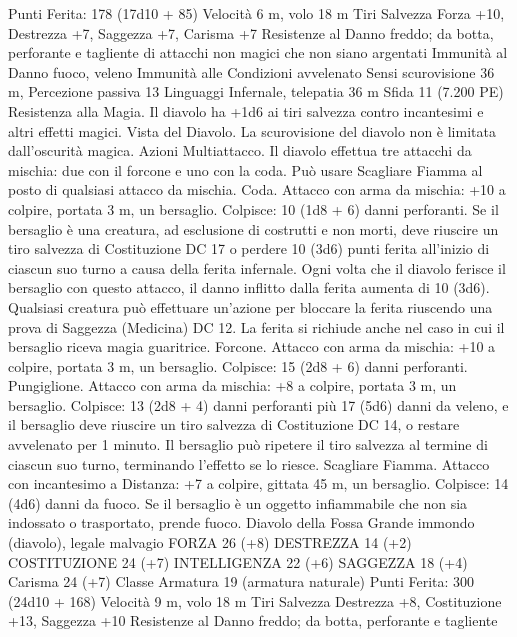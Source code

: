 \begin{multicols}{2}
\hspace*{0pt}\hfill{Punti Ferita}: 178 (17d10 + 85)
Velocità 6 m, volo 18 m
Tiri Salvezza Forza +10, Destrezza +7, Saggezza +7, Carisma
+7
Resistenze al Danno freddo; da botta, perforante e tagliente
di attacchi non magici che non siano argentati
Immunità al Danno fuoco, veleno
Immunità alle Condizioni avvelenato
Sensi scurovisione 36 m, Percezione passiva 13
Linguaggi Infernale, telepatia 36 m
Sfida 11 (7.200 PE)
Resistenza alla Magia. Il diavolo ha +1d6 ai tiri salvezza
contro incantesimi e altri effetti magici.
Vista del Diavolo. La scurovisione del diavolo non è limitata
dall’oscurità magica.
Azioni
Multiattacco. Il diavolo effettua tre attacchi da mischia: due con
il forcone e uno con la coda. Può usare Scagliare Fiamma al
posto di qualsiasi attacco da mischia.
Coda. Attacco con arma da mischia: +10 a colpire, portata 3 m,
un bersaglio.
Colpisce: 10 (1d8 + 6) danni perforanti. Se il bersaglio è una
creatura, ad esclusione di costrutti e non morti, deve riuscire un
tiro salvezza di Costituzione DC 17 o perdere 10 (3d6) punti
ferita all’inizio di ciascun suo turno a causa della ferita infernale.
Ogni volta che il diavolo ferisce il bersaglio con questo attacco,
il danno inflitto dalla ferita aumenta di 10 (3d6). Qualsiasi
creatura può effettuare un’azione per bloccare la ferita riuscendo
una prova di Saggezza (Medicina) DC 12. La ferita si richiude
anche nel caso in cui il bersaglio riceva magia guaritrice.
Forcone. Attacco con arma da mischia: +10 a colpire, portata 3
m, un bersaglio.
Colpisce: 15 (2d8 + 6) danni perforanti.
Pungiglione. Attacco con arma da mischia: +8 a colpire, portata
3 m, un bersaglio.
Colpisce: 13 (2d8 + 4) danni perforanti più 17 (5d6) danni da
veleno, e il bersaglio deve riuscire un tiro salvezza di
Costituzione DC 14, o restare avvelenato per 1 minuto. Il
bersaglio può ripetere il tiro salvezza al termine di ciascun suo
turno, terminando l’effetto se lo riesce.
Scagliare Fiamma. Attacco con incantesimo a Distanza: +7 a
colpire, gittata 45 m, un bersaglio.
Colpisce: 14 (4d6) danni da fuoco. Se il bersaglio è un oggetto
infiammabile che non sia indossato o trasportato, prende fuoco.
Diavolo della Fossa
Grande immondo (diavolo), legale malvagio
FORZA 26 (+8)
DESTREZZA 14 (+2)
COSTITUZIONE 24 (+7)
INTELLIGENZA 22 (+6)
SAGGEZZA 18 (+4)
Carisma 24 (+7)
Classe Armatura 19 (armatura naturale)
\hspace*{0pt}\hfill{Punti Ferita}: 300 (24d10 + 168)
Velocità 9 m, volo 18 m
Tiri Salvezza Destrezza +8, Costituzione +13, Saggezza +10
Resistenze al Danno freddo; da botta, perforante e tagliente

\end{multicols}
